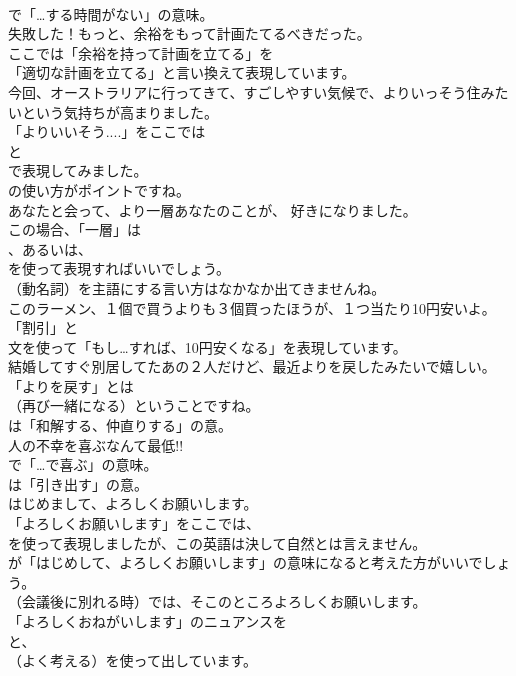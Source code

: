 \documentclass[8pt]{extreport}
\begin{document}
\begin{CJK}{UTF8}{min}
\\	で「…する時間がない」の意味。	
\\	失敗した！もっと、余裕をもって計画たてるべきだった。 
\\	ここでは「余裕を持って計画を立てる」を
\\	「適切な計画を立てる」と言い換えて表現しています。	
\\	今回、オーストラリアに行ってきて、すごしやすい気候で、よりいっそう住みたいという気持ちが高まりました。 
\\	「よりいいそう....」をここでは
\\	と
\\	で表現してみました。
\\	の使い方がポイントですね。	
\\	あなたと会って、より一層あなたのことが、 好きになりました。 
\\	この場合、「一層」は
\\	、あるいは、
\\	を使って表現すればいいでしょう。
\\	（動名詞）を主語にする言い方はなかなか出てきませんね。	
\\	このラーメン、１個で買うよりも３個買ったほうが、１つ当たり10円安いよ。 
\\	「割引」と
\\	文を使って「もし…すれば、10円安くなる」を表現しています。	
\\	結婚してすぐ別居してたあの２人だけど、最近よりを戻したみたいで嬉しい。 
\\	「よりを戻す」とは
\\	（再び一緒になる）ということですね。
\\	は「和解する、仲直りする」の意。	
\\	人の不幸を喜ぶなんて最低!! 
\\	で「…で喜ぶ」の意味。
\\	は「引き出す」の意。	
\\	はじめまして、よろしくお願いします。 
\\	「よろしくお願いします」をここでは、
\\	を使って表現しましたが、この英語は決して自然とは言えません。
\\	が「はじめして、よろしくお願いします」の意味になると考えた方がいいでしょう。	
\\	（会議後に別れる時）では、そこのところよろしくお願いします。 
\\	「よろしくおねがいします」のニュアンスを
\\	と、
\\	（よく考える）を使って出しています。	

\end{CJK}
\end{document}
